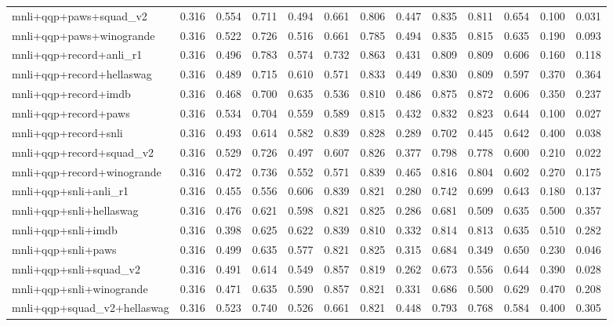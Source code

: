 \begin{table}[t]
\begin{tabular}{lrrrrrrrrrrrr}
    mnli+qqp+paws+squad\_v2 & 0.316 & 0.554 & 0.711 & 0.494 & 0.661 & 0.806 & 0.447 & 0.835 & 0.811 & 0.654 & 0.100 & 0.031 \\
    mnli+qqp+paws+winogrande & 0.316 & 0.522 & 0.726 & 0.516 & 0.661 & 0.785 & 0.494 & 0.835 & 0.815 & 0.635 & 0.190 & 0.093 \\
    mnli+qqp+record+anli\_r1 & 0.316 & 0.496 & 0.783 & 0.574 & 0.732 & 0.863 & 0.431 & 0.809 & 0.809 & 0.606 & 0.160 & 0.118 \\
    mnli+qqp+record+hellaswag & 0.316 & 0.489 & 0.715 & 0.610 & 0.571 & 0.833 & 0.449 & 0.830 & 0.809 & 0.597 & 0.370 & 0.364 \\
    mnli+qqp+record+imdb & 0.316 & 0.468 & 0.700 & 0.635 & 0.536 & 0.810 & 0.486 & 0.875 & 0.872 & 0.606 & 0.350 & 0.237 \\
    mnli+qqp+record+paws & 0.316 & 0.534 & 0.704 & 0.559 & 0.589 & 0.815 & 0.432 & 0.832 & 0.823 & 0.644 & 0.100 & 0.027 \\
    mnli+qqp+record+snli & 0.316 & 0.493 & 0.614 & 0.582 & 0.839 & 0.828 & 0.289 & 0.702 & 0.445 & 0.642 & 0.400 & 0.038 \\
    mnli+qqp+record+squad\_v2 & 0.316 & 0.529 & 0.726 & 0.497 & 0.607 & 0.826 & 0.377 & 0.798 & 0.778 & 0.600 & 0.210 & 0.022 \\
    mnli+qqp+record+winogrande & 0.316 & 0.472 & 0.736 & 0.552 & 0.571 & 0.839 & 0.465 & 0.816 & 0.804 & 0.602 & 0.270 & 0.175 \\
    mnli+qqp+snli+anli\_r1 & 0.316 & 0.455 & 0.556 & 0.606 & 0.839 & 0.821 & 0.280 & 0.742 & 0.699 & 0.643 & 0.180 & 0.137 \\
    mnli+qqp+snli+hellaswag & 0.316 & 0.476 & 0.621 & 0.598 & 0.821 & 0.825 & 0.286 & 0.681 & 0.509 & 0.635 & 0.500 & 0.357 \\
    mnli+qqp+snli+imdb & 0.316 & 0.398 & 0.625 & 0.622 & 0.839 & 0.810 & 0.332 & 0.814 & 0.813 & 0.635 & 0.510 & 0.282 \\
    mnli+qqp+snli+paws & 0.316 & 0.499 & 0.635 & 0.577 & 0.821 & 0.825 & 0.315 & 0.684 & 0.349 & 0.650 & 0.230 & 0.046 \\
    mnli+qqp+snli+squad\_v2 & 0.316 & 0.491 & 0.614 & 0.549 & 0.857 & 0.819 & 0.262 & 0.673 & 0.556 & 0.644 & 0.390 & 0.028 \\
    mnli+qqp+snli+winogrande & 0.316 & 0.471 & 0.635 & 0.590 & 0.857 & 0.821 & 0.331 & 0.686 & 0.500 & 0.629 & 0.470 & 0.208 \\
    mnli+qqp+squad\_v2+hellaswag & 0.316 & 0.523 & 0.740 & 0.526 & 0.661 & 0.821 & 0.448 & 0.793 & 0.768 & 0.584 & 0.400 & 0.305 \\

\end{tabular}
\end{table}
